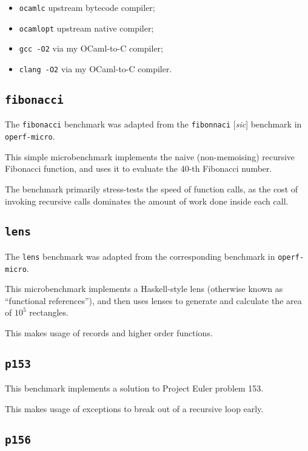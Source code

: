 \documentclass[12pt,a4paper,twoside,openright]{report}
\begin{document}
\begin{itemize}
    \item \lstinline!ocamlc! upstream bytecode compiler;
    \item \lstinline!ocamlopt! upstream native compiler;
    \item \lstinline!gcc -O2! via my OCaml-to-C compiler;
    \item \lstinline!clang -O2! via my OCaml-to-C compiler.
\end{itemize}


\subsection{\texttt{fibonacci}}

The \lstinline!fibonacci! benchmark was adapted from the \lstinline!fibonnaci!
[\textit{sic}] benchmark in \lstinline!operf-micro!.

This simple microbenchmark implements the naive (non-memoising) recursive
Fibonacci function, and uses it to evaluate the $40$-th Fibonacci number.

The benchmark primarily stress-tests the speed of function calls, as the cost
of invoking recursive calls dominates the amount of work done inside each call.

\subsection{\texttt{lens}}

The \lstinline!lens! benchmark was adapted from the corresponding benchmark in
\lstinline!operf-micro!.

This microbenchmark implements a Haskell-style lens (otherwise known as
``functional references''), and then uses lenses to generate and calculate the
area of $10^5$ rectangles.

This makes usage of records and higher order functions.

\subsection{\texttt{p153}}

This benchmark implements a solution to Project Euler problem 153.

This makes usage of exceptions to break out of a recursive loop early.

\subsection{\texttt{p156}}
\end{document}
